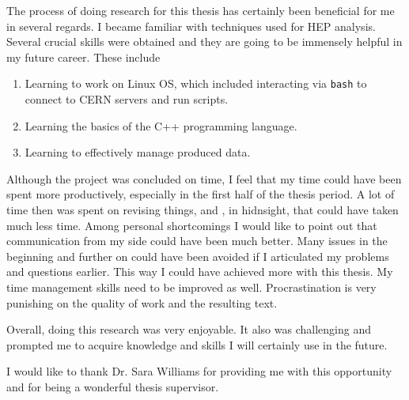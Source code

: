 The process of doing research for this thesis has certainly been beneficial for me in several regards. I became familiar with techniques used for HEP analysis.
Several crucial skills were obtained and they are going to be immensely helpful in my future career. These include
\begin{enumerate}
\item Learning to work on Linux OS, which included interacting via \texttt{bash} to connect to CERN servers and run scripts.
\item Learning the basics of the C++ programming language.
\item Learning to effectively manage produced data.
\end{enumerate}

Although the project was concluded on time, I feel that my time could have been spent more productively, especially in the first half of the thesis period. A lot of time then was spent on revising things, and , in hidnsight, that could have taken much less time.
Among personal shortcomings I would like to point out that communication from my side could have been much better. Many issues in the beginning and further on could have been avoided if I articulated my problems and questions earlier. This way I could have achieved more with this thesis. My time management skills need to be improved as well. Procrastination is very punishing on the quality of work and the resulting text. 

Overall, doing this research was very enjoyable. It also was challenging and prompted me to acquire knowledge and skills I will certainly use in the future. 

I would like to thank Dr. Sara Williams for providing me with this opportunity and for being a wonderful thesis supervisor.

